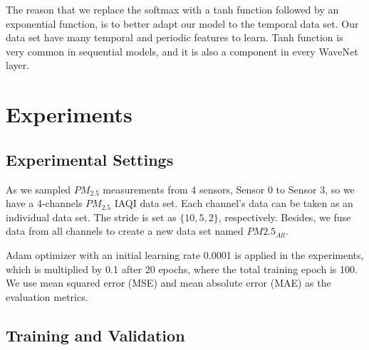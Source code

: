 \documentclass[sigconf]{acmart}
\begin{document}
The reason that we replace the softmax with a tanh function followed by an exponential function, is to better adapt our model to the temporal data set. Our data set have many temporal and periodic features to learn. Tanh function is very common in sequential models, and it is also a component in every WaveNet layer.

\section{Experiments}

\subsection{Experimental Settings}

As we sampled $PM_{2.5}$ measurements from 4 sensors, Sensor 0 to Sensor 3, so we have a 4-channels $PM_{2.5}$ IAQI data set. Each channel's data can be taken as an individual data set. The stride is set as $\{10, 5, 2\}$, respectively. Besides, we fuse data from all channels to create a new data set named $PM2.5_{All}$.

Adam\cite{kingma2017adam} optimizer with an initial learning rate 0.0001 is applied in the experiments, which is multiplied by 0.1 after 20 epochs, where the total training epoch is 100.
We use mean squared error (MSE) and mean absolute error (MAE) as the evaluation metrics.


\subsection{Training and Validation} %
\end{document}
